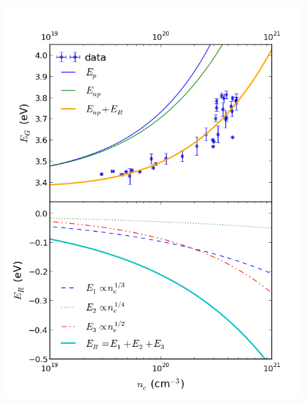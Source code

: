\documentclass[aps,prl,preprint,showpacs,showkeys,linenumbers]{revtex4-1}
\begin{document}
\begin{figure}[p]
\includegraphics[scale=0.8]{figure5_b.png}
\caption{\label{fig:4}}
\end{figure}
\end{document}
